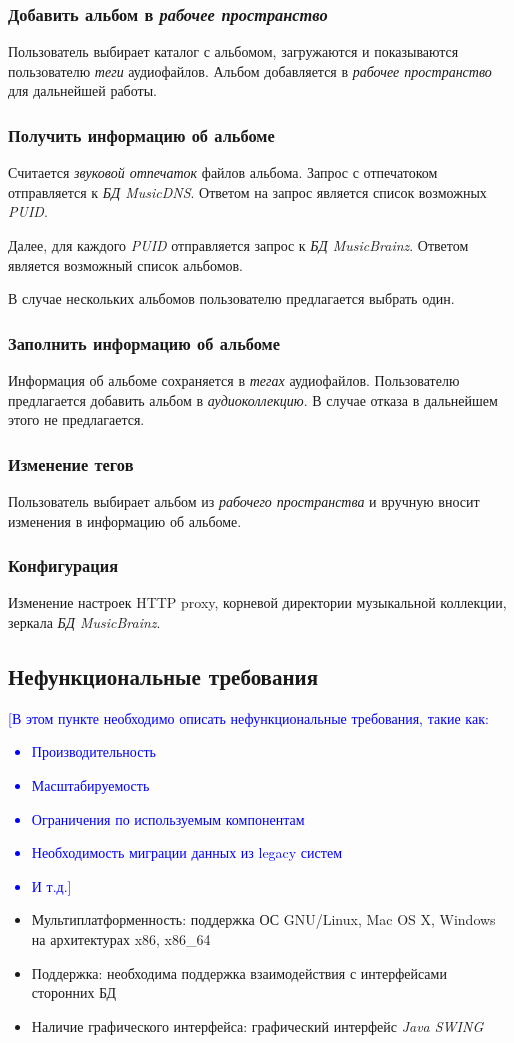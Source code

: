 \documentclass[pdftex,12pt,a4paper]{report}
\providecommand{\comment}[1]{\textcolor{blue}{#1}}
\begin{document}
\subsubsection{Добавить альбом в {\it рабочее пространство}}
Пользователь выбирает каталог с альбомом, загружаются и показываются пользователю {\it теги} аудиофайлов.
Альбом добавляется в {\it рабочее пространство} для дальнейшей работы.

\subsubsection{Получить информацию об альбоме}
Считается {\it звуковой отпечаток} файлов альбома. Запрос с отпечатоком отправляется к {\it БД MusicDNS}.
Ответом на запрос является список возможных {\it PUID}.

Далее, для каждого {\it PUID} отправляется запрос к {\it БД MusicBrainz}.
Ответом является возможный список альбомов.

В случае нескольких альбомов пользователю предлагается выбрать один.

\subsubsection{Заполнить информацию об альбоме}
Информация об альбоме сохраняется в {\it тегах} аудиофайлов.
Пользователю предлагается добавить альбом в {\it аудиоколлекцию}.
В случае отказа в дальнейшем этого не предлагается.

\subsubsection{Изменение тегов}
Пользователь выбирает альбом из {\it рабочего пространства} и вручную вносит изменения в информацию об альбоме.

\subsubsection{Конфигурация}
Изменение настроек HTTP proxy, корневой директории музыкальной коллекции, зеркала {\it БД MusicBrainz}.

\subsection{Нефункциональные требования}
\comment{[В этом пункте необходимо описать нефункциональные требования, такие как:
\begin{itemize}
	\item Производительность
	\item Масштабируемость
	\item Ограничения по используемым компонентам
	\item Необходимость миграции данных из legacy систем
	\item И т.д.]
\end{itemize}}

\begin{itemize}
	\item Мультиплатформенность: поддержка ОС GNU/Linux, Mac OS X, Windows на архитектурах x86, x86\_64
	\item Поддержка: необходима поддержка взаимодействия с интерфейсами сторонних БД
	\item Наличие графического интерфейса: графический интерфейс {\it Java SWING}
\end{itemize}
\end{document}
